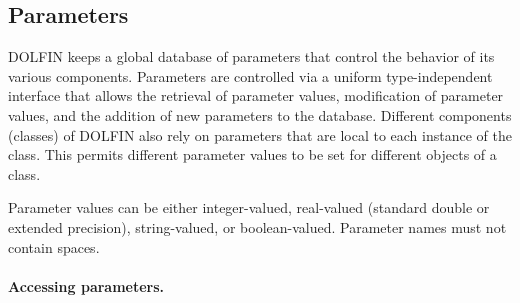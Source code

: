 \subsection{Parameters}

DOLFIN keeps a global database of parameters that control the behavior
of its various components. Parameters are controlled via a uniform
type-independent interface that allows the retrieval of parameter
values, modification of parameter values, and the addition of new
parameters to the database. Different components (classes) of DOLFIN
also rely on parameters that are local to each instance of the class.
This permits different parameter values to be set for different
objects of a class.

Parameter values can be either integer-valued, real-valued (standard
double or extended precision), string-valued, or boolean-valued. Parameter
names must not contain spaces.

\paragraph{Accessing parameters.}

